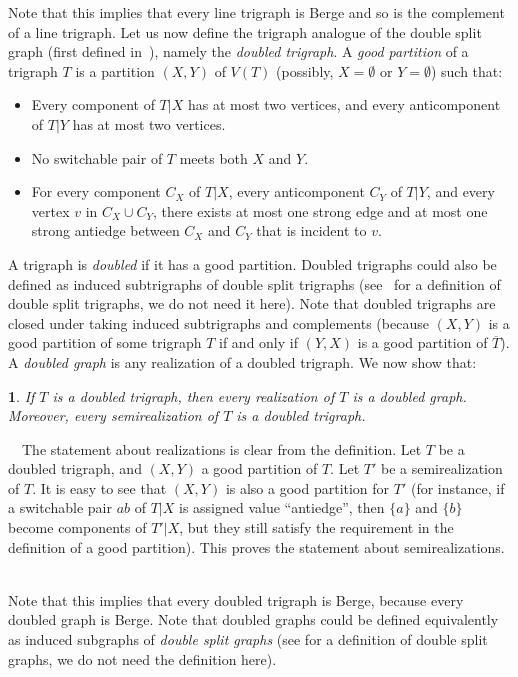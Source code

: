 \documentclass[11 pt] {article}
\newcommand\blackslug{\hbox{\hskip 1pt \vrule width 4pt height 8pt depth 1.5pt
        \hskip 1pt}}
\newcommand\bbox{\hfill \quad \blackslug \medbreak}
\newtheorem{theorem}{}[section]
\newcounter{claim}
\newcommand{\Proof}{\setcounter{claim}{0}\noindent{\bf Proof.}\ \ }
\begin{document}
Note that this implies that every line trigraph is Berge and so is the
complement of a line trigraph. Let us now define the trigraph analogue
of the double split graph (first defined in~\cite{CRST}), namely the
{\em doubled trigraph}.  A \emph{good partition} of a trigraph $T$ is
a partition $(X, Y)$ of $V(T)$ (possibly, $X=\emptyset$ or
$Y=\emptyset$) such that:

\begin{itemize}
\item Every  component of $T|X$ has at most two vertices, and every
  anticomponent of $T|Y$ has at most two vertices.
\item No switchable pair of $T$ meets both $X$ and $Y$. 
\item For every component $C_X$ of $T|X$, every anticomponent $C_Y$ of
  $T|Y$, and every vertex $v$ in $C_X \cup C_Y$, there exists at most
  one strong edge and at most one strong antiedge between $C_X$ and
  $C_Y$ that is incident to $v$.
\end{itemize}

A trigraph is \emph{doubled} if it has a good partition.  Doubled
trigraphs could also be defined as induced subtrigraphs of double
split trigraphs (see~\cite{trigraphs} for a definition of double split
trigraphs, we do not need it here).  Note that doubled trigraphs are
closed under taking induced subtrigraphs and complements (because $(X,
Y)$ is a good partition of some trigraph $T$ if and only if $(Y, X)$
is a good partition of $\overline{T}$).  A \emph{doubled graph} is any
realization of a doubled trigraph. We now show that:

\begin{theorem}
\label{bicotri} 
If $T$ is a doubled trigraph, then every realization of $T$ is a
doubled graph.  Moreover, every semirealization of $T$ is a doubled
trigraph.
\end{theorem}

\Proof The statement about realizations is clear from the
definition. Let $T$ be a doubled trigraph, and $(X, Y)$ a good
partition of $T$.  Let $T'$ be a semirealization of $T$.  It is easy
to see that $(X, Y)$ is also a good partition for $T'$ (for instance,
if a switchable pair $ab$ of $T|X$ is assigned value ``antiedge'',
then $\{a\}$ and $\{b\}$ become components of $T'|X$, but they still
satisfy the requirement in the definition of a good partition).
This proves the statement about semirealizations.  \bbox

Note that this implies that every doubled trigraph is Berge, because
every doubled graph is Berge.  Note that doubled graphs could be
defined equivalently as induced subgraphs of \emph{double split
  graphs} (see \cite{CRST} for a definition of double split graphs, we
do not need the definition here).
\end{document}
